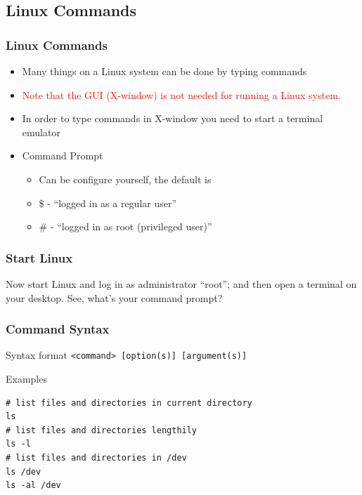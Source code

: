 \documentclass[red]{beamer}
\begin{document}
\begin{CJK*}{UTF8}{gbsn}
\subsection{Linux Commands}
\begin{frame}
\frametitle{Linux Commands}
\begin{itemize}
    \item Many things on a Linux system can be done by typing commands
    \item \textcolor{red}{Note that the GUI (X-window) is not needed for running a Linux system.}
    \item In order to type commands in X-window you need to start a terminal emulator
    \item Command Prompt
    \begin{itemize}
        \item Can be configure yourself, the default is
        \item \$ - ``logged in as a regular user''
        \item \# - ``logged in as root (privileged user)''
    \end{itemize}
\end{itemize}
\end{frame}

\begin{frame}
\frametitle{Start Linux}
\Large Now start Linux and log in as administrator ``root''; and then open a 
	terminal on your desktop. See, what's your command prompt?
\end{frame}

\begin{frame}[t,fragile]
\frametitle{Command Syntax}
\begin{block}{Syntax format}
\lstinline{<command> [option(s)] [argument(s)]}
\end{block}

\begin{block}{Examples}
\begin{lstlisting}
# list files and directories in current directory
ls
# list files and directories lengthily
ls -l
# list files and directories in /dev
ls /dev
ls -al /dev
\end{lstlisting}
\end{block}
\end{frame}


\end{CJK*}
\end{document}
